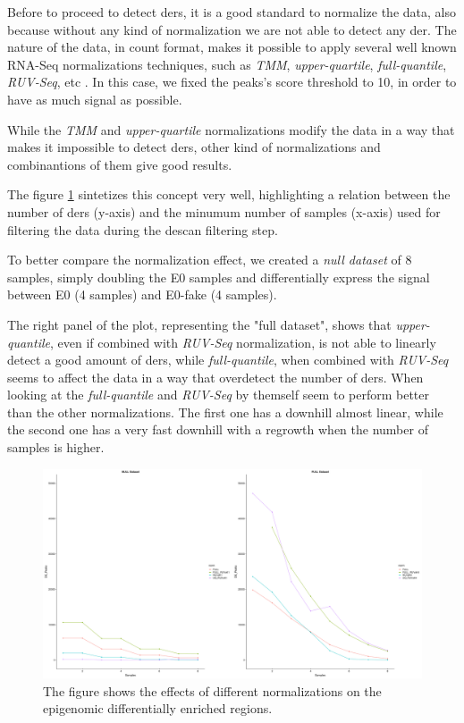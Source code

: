 Before to proceed to detect \glspl{der}, it is a good standard to normalize the data, also because without any kind of normalization we are not able to detect any \gls{der}.
The nature of the data, in count format, makes it possible to apply several well known RNA-Seq normalizations techniques, such as \textit{TMM}, \textit{upper-quartile}, \textit{full-quantile}, \textit{RUV-Seq}, etc \cite{Risso2014h, Robinson2010, Dillies2013}.
In this case, we fixed the peaks's score threshold to 10, in order to have as much signal as possible.

While the \textit{TMM} and \textit{upper-quartile} normalizations modify the data in a way that makes it impossible to detect \glspl{der}, other kind of normalizations and combinantions of them give good results.

The figure \ref{fig:normalizationsnullfull} sintetizes this concept very well, highlighting a relation between the number of \glspl{der} (y-axis) and the minumum number of samples (x-axis) used for filtering the data during the \gls{descan} filtering step.

To better compare the normalization effect, we created a \textit{null dataset} of 8 samples, simply doubling the E0 samples and differentially express the signal between E0 (4 samples) and E0-fake (4 samples).

The right panel of the plot, representing the "full dataset", shows that \textit{upper-quantile}, even if combined with \textit{RUV-Seq} normalization, is not able to linearly detect a good amount of \glspl{der}, while \textit{full-quantile}, when combined with \textit{RUV-Seq} seems to affect the data in a way that overdetect the number of \glspl{der}. 
When looking at the \textit{full-quantile} and \textit{RUV-Seq} by themself seem to perform better than the other normalizations. The first one has a downhill almost linear, while the second one has a very fast downhill with a regrowth when the number of samples is higher.

\begin{figure}[H]
\centering
\includegraphics[width=\textwidth, height=\textheight, keepaspectratio]{img/descan2/normalizations_null_full.png}
\caption[Normalizations applied to detected regions]{The figure shows the effects of different normalizations on the epigenomic differentially enriched regions.}
\label{fig:normalizationsnullfull}
\centering
\end{figure}

